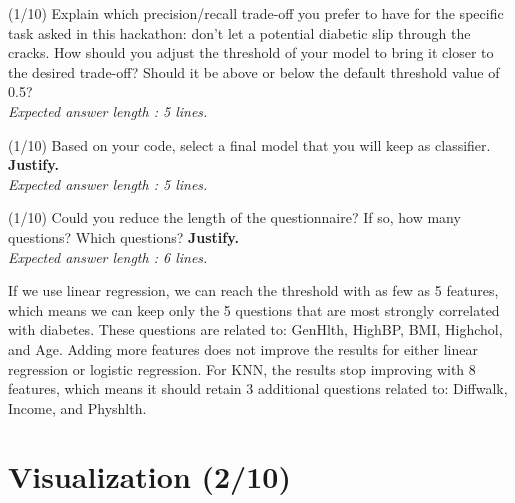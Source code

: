 \documentclass [a4paper, 11pt] {article}
\begin{document}
\begin{question}{2.2}
(1/10) Explain which precision/recall trade-off you prefer to have for the specific task asked in this hackathon: don't let a potential diabetic slip through the cracks. How should you adjust the threshold of your model to bring it closer to the desired trade-off? Should it be above or below the default threshold value of 0.5?\\
\textit{Expected answer length : 5 lines.}
\end{question}
\begin{answer}\color{blue}
\end{answer}

\begin{question}{2.3}
(1/10) Based on your code, select a final model that you will keep as classifier. \textbf{Justify.} \\
\textit{Expected answer length : 5 lines.}
\end{question}
\begin{answer} \color{blue}
\end{answer}

\begin{question}{2.4}
(1/10) Could you reduce the length of the questionnaire? If so, how many questions? Which questions? \textbf{Justify.}\\
\textit{Expected answer length : 6 lines.}
\end{question}
\begin{answer}\color{blue}
If we use linear regression, we can reach the threshold with as few as 5 features, which means we can keep only the 5 questions 
that are most strongly correlated with diabetes. These questions are related to: GenHlth, HighBP, BMI, Highchol, and Age. 
Adding more features does not improve the results for either linear regression or logistic regression. For KNN, the results 
stop improving with 8 features, which means it should retain 3 additional questions related to: Diffwalk, Income, and Physhlth.
\end{answer}


\section{Visualization (2/10)}
\end{document}
